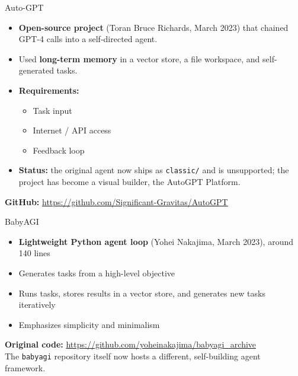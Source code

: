 \begin{frame}{Auto-GPT}
    \begin{itemize}
        \item[\textcolor{red}{$\triangleright$}] \textbf{Open-source project} (Toran Bruce Richards, March 2023) that chained GPT-4 calls into a self-directed agent.
        \item[\textcolor{red}{$\triangleright$}] Used \textbf{long-term memory} in a vector store, a file workspace, and self-generated tasks.
        \item[\textcolor{red}{$\triangleright$}] \textbf{Requirements:}
        \begin{itemize}
            \item Task input
            \item Internet / API access
            \item Feedback loop
        \end{itemize}
        \item[\textcolor{red}{$\triangleright$}] \textbf{Status:} the original agent now ships as
          \texttt{classic/} and is unsupported; the project has become a visual builder, the AutoGPT Platform.
    \end{itemize}
    \vspace{0.5em}
    \textbf{GitHub:} \url{https://github.com/Significant-Gravitas/AutoGPT}
\end{frame}

\begin{frame}{BabyAGI}
    \begin{itemize}
        \item[\textcolor{red}{$\triangleright$}] \textbf{Lightweight Python agent loop} (Yohei Nakajima, March 2023), around 140 lines
        \item[\textcolor{red}{$\triangleright$}] Generates tasks from a high-level objective
        \item[\textcolor{red}{$\triangleright$}] Runs tasks, stores results in a vector store, and generates new tasks iteratively
        \item[\textcolor{red}{$\triangleright$}] Emphasizes simplicity and minimalism
    \end{itemize}
    \vspace{0.5em}
    \textbf{Original code:} \url{https://github.com/yoheinakajima/babyagi_archive}\\
    {\scriptsize The \texttt{babyagi} repository itself now hosts a different, self-building agent framework.}
\end{frame}


